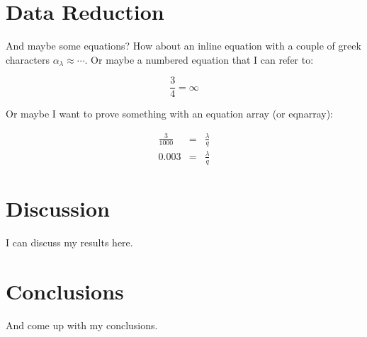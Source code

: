 \documentclass{article}
\begin{document}
\section{Data Reduction}

And maybe some equations? How about an inline equation with a couple
of greek characters $\alpha_{\lambda} \approx \cdots $. Or maybe a
numbered equation that I can refer to:

\begin{equation}
\frac{3}{4} = \infty
\end{equation}

Or maybe I want to prove something with an equation array (or eqnarray):

\begin{eqnarray}
\frac{3}{1000} & = & \frac{\lambda}{q} \\
0.003 & = & \frac{\lambda}{q}
\end{eqnarray}

\section{Discussion}

I can discuss my results here. 

\section{Conclusions}

And come up with my conclusions.
\end{document}

